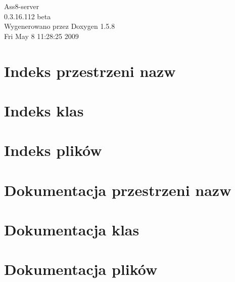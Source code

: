 \documentclass[a4paper]{book}
\begin{document}
\begin{titlepage}
\vspace*{7cm}
\begin{center}
{\Large Ass8-server \\[1ex]\large 0.3.16.112 beta }\\
\vspace*{1cm}
{\large Wygenerowano przez Doxygen 1.5.8}\\
\vspace*{0.5cm}
{\small Fri May 8 11:28:25 2009}\\
\end{center}
\end{titlepage}
\clearemptydoublepage
{}
\tableofcontents
\clearemptydoublepage
{}
\chapter{Indeks przestrzeni nazw}

\chapter{Indeks klas}

\chapter{Indeks plików}

\chapter{Dokumentacja przestrzeni nazw}

\chapter{Dokumentacja klas}


\chapter{Dokumentacja plików}









\printindex
\end{document}
